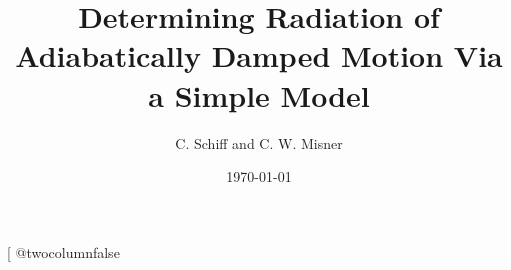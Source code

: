 %
% 
%
%
%
%
%  

%
%

\def\.{{\quad .}}
\def\_.{{\quad .}}
\def\_,{{\quad ,}}

%
%

\draft



\twocolumn[\hsize\textwidth\columnwidth\hsize\csname
@twocolumnfalse\endcsname
{}

%
%
\title{Determining Radiation of Adiabatically Damped Motion 
       Via a Simple Model}
%
\author{C. Schiff and C. W. Misner}
\address{
            Department of Physics, University of Maryland,
            College Park MD 20742-4111 USA\\
           \rm
         e-mail: \tt  cmschiff@erols.com\\
                      misner@umail.umd.edu\\
					  Revision 2.0
}
\date{\today}
\maketitle


